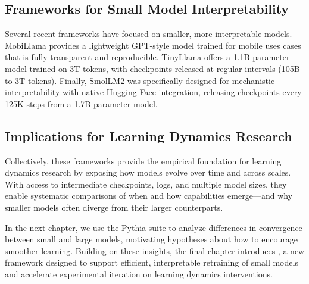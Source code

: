 \subsection{Frameworks for Small Model Interpretability}

Several recent frameworks have focused on smaller, more interpretable models. MobiLlama \citep{thawakar2024mobillama} provides a lightweight GPT-style model trained for mobile uses cases that is fully transparent and reproducible. TinyLlama \citep{liu2023llm360} offers a 1.1B-parameter model trained on 3T tokens, with checkpoints released at regular intervals (105B to 3T tokens). Finally, SmolLM2 \citep{allal2025smollm2} was specifically designed for mechanistic interpretability with native Hugging Face integration, releasing checkpoints every 125K steps from a 1.7B-parameter model. 

\subsection{Implications for Learning Dynamics Research}

Collectively, these frameworks provide the empirical foundation for learning dynamics research by exposing how models evolve over time and across scales. With access to intermediate checkpoints, logs, and multiple model sizes, they enable systematic comparisons of when and how capabilities emerge—and why smaller models often diverge from their larger counterparts.

In the next chapter, we use the Pythia suite to analyze differences in convergence between small and large models, motivating hypotheses about how to encourage smoother learning. Building on these insights, the final chapter introduces \pico, a new framework designed to support efficient, interpretable retraining of small models and accelerate experimental iteration on learning dynamics interventions.
